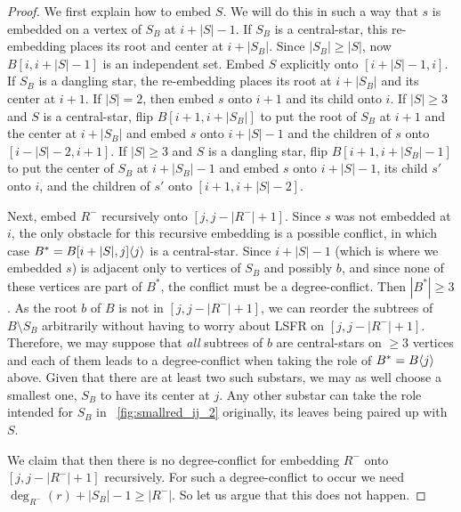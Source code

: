 \documentclass[11pt,a4paper,colorlinks=true,urlcolor=blue,citecolor=red]{article}
\theoremstyle{plain}
\begin{document}
\begin{proof}
  We first explain how to embed $S$. We will do this in such a way that
  $s$ is embedded on a vertex of $S_B$ at $i+|S|-1$.
If $S_B$ is a central-star, this re-embedding places its root and
  center at $i+|S_B|$. Since $|S_B|\geq|S|$, now $B[i,i+|S|-1]$ is an
  independent set. Embed $S$ explicitly onto $[i+|S|-1,i]$.
If $S_B$ is a dangling star, the re-embedding places its root at
  $i+|S_B|$ and its center at $i+1$. If $|S|=2$, then embed $s$ onto
  $i+1$ and its child onto $i$.
If $|S|\geq3$ and $S$ is a central-star, flip $B[i+1,i+|S_B|]$ to
  put the root of $S_B$ at $i+1$ and the center at $i+|S_B|$ and embed
  $s$ onto $i+|S|-1$ and the children of $s$ onto $[i-|S|-2,i+1]$.
If $|S|\geq3$ and $S$ is a dangling star, flip $B[i+1,i+|S_B|-1]$ to
  put the center of $S_B$ at $i+|S_B|-1$ and embed $s$ onto $i+|S|-1$,
  its child $s'$ onto $i$, and the children of $s'$ onto
  $[i+1,i+|S|-2]$.

  Next, embed $R^-$ recursively onto $[j,j-|R^-|+1]$. Since $s$ was not
  embedded at $i$, the only obstacle for this recursive embedding is a
  possible conflict, in which case $B^*=B{[i+|S|,j]}\langle{j}\rangle$ is a
  central-star. Since $i+|S|-1$ (which is where we embedded $s$) is
  adjacent only to vertices of $S_B$ and possibly $b$, and since none of
  these vertices are part of $B^*$, the conflict must be a
  degree-conflict. Then $|B^*|\geq3$. As the root $b$ of $B$ is not in
  $[j,j-|R^-|+1]$, we can reorder the subtrees of $B\setminus S_B$
  arbitrarily without having to worry about LSFR on $[j,j-|R^-|+1]$.
  Therefore, we may suppose that \emph{all} subtrees of $b$ are
  central-stars on $\ge 3$ vertices and each of them leads to a
  degree-conflict when taking the role of $B^*=B\langle{j}\rangle$ above. Given
  that there are at least two such substars, we may as well choose a
  smallest one, $S_B$ to have its center at $j$. Any other substar can
  take the role intended for $S_B$ in
  \figurename~\ref{fig:smallred_ij_2} originally, its leaves being
  paired up with $S$.

  We claim that then there is no degree-conflict for embedding $R^-$
  onto $[j,j-|R^-|+1]$ recursively. For such a degree-conflict to occur
  we need $\deg_{R^-}(r)+|S_B|-1\ge|R^-|$. So let us argue that this
  does not happen.


\end{proof}
\end{document}
